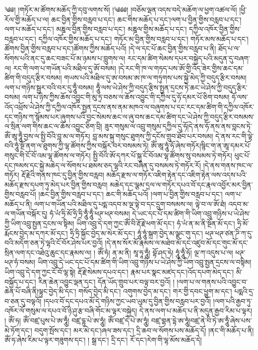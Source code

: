 ༄༅། །གཏོར་མ་ཚོགས་མཆོད་ཀྱི་དབུ་ལགས་སོ། །༄༅༅། །བཅོམ་ལྡན་འདས་བདེ་མཆོག་ལ་ཕྱག་འཚལ་ལོ། །ཕྱི་རོལ་གྱི་མཆོད་པ་ལ། ཆང་བྱིན་གྱིས་བརླབ་པ་དང་། ཆང་གིས་མཆོད་པ་དང་།ལག་པ་བྱིན་གྱིས་བརླབ་པ་དང་། ལག་པ་མཆོད་པ་དང་། མཎྜལ་བྱིན་གྱིས་བརླབ་པ་དང་། མཎྜལ་གྱིས་མཆོད་པ་དང་། དཀྱིལ་འཁོར་བྱིན་གྱིས་བརླབ་པ་དང་། དཀྱིལ་འཁོར་གྱིས་མཆོད་པ་དང་། གཏོར་མ་བྱིན་གྱིས་བརླབ་པ་དང་། གཏོར་མས་མཆོད་པ་དང་། ཚོགས་བྱིན་གྱིས་བརླབ་པ་དང་།ཚོགས་ཀྱིས་མཆོད་པའོ། །དེ་ལ་དང་པོ་ཆང་བྱིན་གྱིས་བརླབ་པ་ནི། ཐོད་པ་ལ་སོགས་པའི་ནང་དུ་ཆང་བཟང་པོ་མ་ཉམས་པ་བླུགས་ལ། རང་དམ་ཚིག་སེམས་དཔར་བསྐྱེད་པའི་མདུན་དུ་བཞག་ལ། རང་གི་ལག་པ་གཡོན་པའི་མཐིལ་དུ་ཨོ་བསམ། །དེ་རང་གི་ཁ་ལ་གཏད་པས་ཨོ་གྱི་འོད་ཟེར་གྱིས་ཆང་དམ་ཚིག་གི་བདུད་རྩིར་བསམ། གཡས་པའི་མཐིལ་དུ་ཨ་བསམ་ཨ་ཁ་ལ་གཏུགས་པས་སྐྱེ་མེད་ཀྱི་བདུད་རྩིར་བསམ། ལག་པ་གཉིས་སྦྱར་བའི་བར་དུ་ཧཱུྃ་བསམ། ཧཱུྃ་ལས་ཡེ་ཤེས་ཀྱི་བདུད་རྩིས་སྤྱན་དྲངས་ཏེ་ཆང་ཡེ་ཤེས་ཀྱི་བདུད་རྩིར་བསམ། ལག་པ་ཉིས་ཀྱིས་ཆོས་འབྱུང་གི་མུ་ཏྲ་བཅས་ལ་ཆོས་འབྱུང་གི་དཀྱིལ་དུ་ཧོ་དམར་པོ་ཅིག་བསམ། ཧོ་ལས་འོད་འཕྲོས་ཡེ་ཤེས་ཀྱི་དཀྱིལ་འཁོར་སྤྱན་དྲངས་ནས་ནམ་མཁའ་ལ་བཞུགས་པ་དང་རང་དམ་ཚིག་གི་དཀྱིལ་འཁོར་དང་གཉིས་ཀ་སྙོམས་པར་ཞུགས་པའི་བྱང་སེམས་ཆང་ལ་ཞུ་བས་ཆང་དམ་ཚིག་དང་ཡེ་ཤེས་ཀྱི་བདུད་རྩིར་བསམས་ལ་སྲིན་ལག་གིས་ཆང་ལ་ཆོས་འབྱུང་ཅིག་བྲི། ཟུར་གསུམ་ལ་འབྲུ་གསུམ་དཀྱིལ་དུ་ཧོ།དེ་ནས་ཧོ་ནས་ནས་བླངས་ཏེ་ཨོཾ་ཨཱ་ཧཱུྃ་བྱས་ལ་སྤྱི་བོའི་བླ་མ་ལ་གཏོར། བླ་མས་སྐུ་གསུང་ཐུགས་ཀྱི་དངོས་གྲུབ་ཐོབ་པར་བསམ། དེ་ནས་རང་གི་ལྟེ་བའི་ཧཱུཾ་སྔོ་ནག་ལ་ཐུགས་ཀྱི་ལྷ་ཚོགས་ཀྱིས་བསྐོར་བར་བསམས་ཏེ། ཨོཾ་ཨཱ་ཧཱུཾ་ཧོ་ཞེས་གཏོར།སྙིང་ག་ན་ཨཱ་དམར་པོ་གསུང་གི་ངོ་བོ་འམ་ལྷ་ཚོགས་ལ་གཏོར། སྤྱི་བོའི་ཨོ་དཀར་པོ་སྐུ་ངོ་བོའམ་ལྷ་ཚོགས་སུ་བསམས་ཏེ་གཏོར། ཕུང་པོ་དང་ཁམས་དང་སྐྱེ་མཆེད་ལ་སོགས་པ་ཐམས་ཅད་ལྷའི་རང་བཞིན་དུ་བསམས་ཏེ་གཏོར་རོ། །དེ་ནས་གནས་ཁང་ལ་གཏོར། རྡོ་རྗེའི་གནས་ཁང་དུ་བྱིན་གྱིས་བརླབ། མཆོད་རྫས་ལ་གཏོར་འཇིག་རྟེན་དང་འཇིག་རྟེན་ལས་འདས་པའི་མཆོད་རྫས་དཔག་ཏུ་མེད་པར་བྱིན་གྱིས་བརླབ། མཆེད་དང་ལྕམ་དྲལ་ལ་གཏོར་དཔའ་བོ་དང་རྣལ་འབྱོར་མར་བྱིན་གྱིས་བརླབ་པོ། །ཆང་བྱིན་གྱིས་བརླབ་པ་དང་། ཆང་གི་མཆོད་པའོ། །ལག་པ་བྱིན་གྱིས་བརླབ་པ་དང་། ལག་པ་མཆོད་པ་ནི། ལག་པ་གཡོན་པའི་མཐིལ་དུ་པདྨ་འདབ་མ་ལྔ་ལྟེ་བ་དང་དྲུག་བསམས་ལ། ལྟེ་བ་ལ་ཨོ་ཐཾ། འདབ་མ་ལ་གཡོན་བསྐོར་དུ། ཧཾ་ཡཾ་ཧྲི་མོ་ཧྲི་ཧྲི་ཧཱུྃ་ཧཱུྃ་ཕཊ་ཕཊ་བསམ། དེ་ཡང་དང་པོ་དམ་ཚིག་གི་ཡིག་འབྲུ་གཉིས་པ་ཡེ་ཤེས་ཀྱི་ཡིག་འབྲུ་སྤྱན་དྲངས་ལ་སྟིམ། ཡིག་འབྲུ་དེ་དག་ཀྱང་ཨོཾ་བི་རྡོ་རྗེ་ཕག་མོ་དང་། ཧཾ་ཡཾ་ན་མ་ནི་སྔོན་མོ་དང་། ཧྲི་མོ་རྨོངས་བྱེད་མ་དཀར་མོ་དང་། ཧྲི་ཧྲི་སྐྱོང་བྱེད་མ་སེར་མོ་དང་། ཧཱུཾ་ཧཱུཾ་སྐྲག་བྱེད་མ་ལྗང་གུ་དང་། ཕཊ་ཕཊ་ཙན་ཌི་ཀ་དུ་བའི་མདོག་ཅན་ཏེ་ལྷའི་ངོ་བོར་ཤེས་པར་བྱའོ། །དེ་ནས་སོར་མོ་རྣམས་ལ་མཐེབ་མོ་དང་འཛུབ་མོ་དང་གུང་མོ་དང་སྲིན་ལག་དང་འཐེའུ་ཆུང་དང་རྣམས་ལ། ། ཨོཾ་ཧཾ། ན་མ་ནི། སཱ་ཧཱ་ཧཱུྃ། བྷོ་ཤད་ཧེ། ཧཱུཾ་ཧཱུྃ་ཧོ། ལྔ་ཀ་འདུས་པ་ལ། ཕཊ་ཕཊ་ཧཾ་བསམ། ཡིག་འབྲུ་དེ་ཡང་དང་པོ་དམ་ཚིག་གི་ཡིག་འབྲུ་གཉིས་པ་ཡེ་ཤེས་ཀྱི་ཡིག་འབྲུ་སྤྱན་དྲངས་ལ་བསྟིམ། ཡིག་འབྲུ་དེ་དག་ཀྱང་ངོ་བོ་ལྷ་སྟེ། རྡོ་རྗེ་སེམས་དཔའ་དང་། རྣམ་པར་སྣང་མཛད་དང་།འོད་དཔག་མེད་དང་། མི་བསྐྱོད་པ་དང་། རིན་ཆེན་འབྱུང་ལྡན་དང་། དོན་ཡོད་གྲུབ་པར་བལྟ་བར་བྱའོ། ། །ལག་པ་ལ་གནས་པའི་འབྱུང་བ་ཆེན་པོ་བཞི་ནི།ལྟུང་བྱེད་མི་དང་། གསོད་བྱེད་མི་དང་། འགུགས་བྱེད་མ་དང་། གར་གྱི་དབང་ཕྱུག་མ་དང་། པདྨའི་དྲ་བ་ཅན་དུ་བལྟའོ། །དཔའ་བོ་དང་དཔའ་མོ་དེ་གཉིས་ཀྱང་ཡབ་ཡུམ་དུ་བྱིན་གྱིས་བརླབ་པར་བྱའོ། །ལག་པའི་རྒྱབ་ཏུ་འཁོར་ལོ་གསུམ་ལ་དཔའ་བོ་ཉི་ཤུ་རྩ་བཞི་གོང་མ་ལྟར་བསྐྱེད། དེ་ནས་ལག་པ་མཆོད་པ་ནི་མདུན་རྒྱབ་རིམ་པ་ལྟར། ། ཨོཾ་ཧ། ཨོཾ་བཛྲ་པུས་པེ་ཨ་ཧཱུྃ། བཛྲ་དྷུ་པེ་ཨ་ཧཱུཾ། ཨོཾ་བཛྲ་དེ་པེ་ཨ་ཧཱུཾ། བཛྲ་གྷན་དྷེ་ཨ་ཧཱུཾ།བཛྲ་ནེ་བི་ཏེ་ཨ་ཧཱུྃ་ཞེས་པས་མེ་ཏོག་དང་། བདུག་སྤོས་དང་། མར་མེ་དང་།ཞལ་ཟས་དང་། དྲི་ཆབ་ལ་སོགས་པས་མཆོད་དོ། །ནང་གི་མཆོད་པ་ནི།ཨོཾ་ཧ་ཞེས་རིམ་པ་ལྟར་གཟུགས་དང་། ། སྒྲ་དང་། དྲི་དང་། རོ་དང་།རེག་གི་ལྷ་མོས་མཆོད་དེ། 